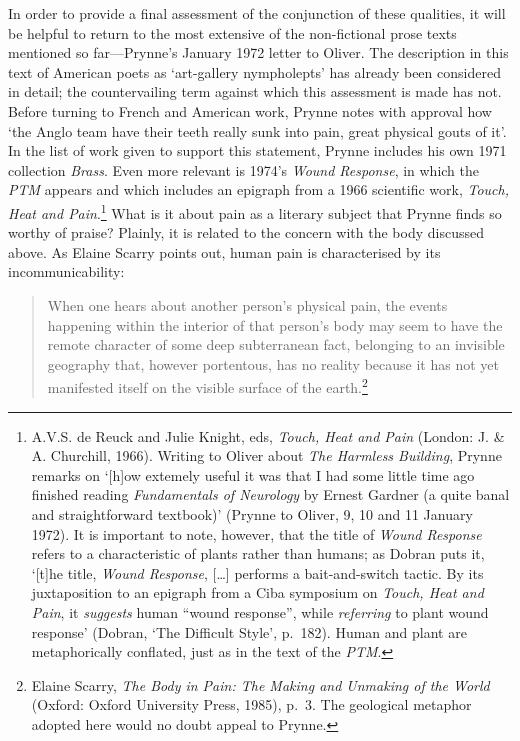 \documentclass[]{article}
\begin{document}
In order to provide a final assessment of the conjunction of these
qualities, it will be helpful to return to the most extensive of the
non-fictional prose texts mentioned so far---Prynne's January 1972
letter to Oliver. The description in this text of American poets as
`art-gallery nympholepts' has already been considered in detail; the
countervailing term against which this assessment is made has not.
Before turning to French and American work, Prynne notes with approval
how `the Anglo team have their teeth really sunk into pain, great
physical gouts of it'. In the list of work given to support this
statement, Prynne includes his own 1971 collection \emph{Brass}. Even
more relevant is 1974's \emph{Wound Response}, in which the \emph{PTM}
appears and which includes an epigraph from a 1966 scientific work,
\emph{Touch, Heat and Pain}.\footnote{A.V.S. de Reuck and Julie Knight,
  eds, \emph{Touch, Heat and Pain} (London: J. \& A. Churchill, 1966).
  Writing to Oliver about \emph{The Harmless Building}, Prynne remarks
  on `{[}h{]}ow extemely useful it was that I had some little time ago
  finished reading \emph{Fundamentals of Neurology} by Ernest Gardner (a
  quite banal and straightforward textbook)' (Prynne to Oliver, 9, 10
  and 11 January 1972). It is important to note, however, that the title
  of \emph{Wound Response} refers to a characteristic of plants rather
  than humans; as Dobran puts it, `{[}t{]}he title, \emph{Wound
  Response}, {[}\ldots{}{]} performs a bait-and-switch tactic. By its
  juxtaposition to an epigraph from a Ciba symposium on \emph{Touch,
  Heat and Pain}, it \emph{suggests} human ``wound response'', while
  \emph{referring} to plant wound response' (Dobran, `The Difficult
  Style', p.~182). Human and plant are metaphorically conflated, just as
  in the text of the \emph{PTM}.} What is it about pain as a literary
subject that Prynne finds so worthy of praise? Plainly, it is related to
the concern with the body discussed above. As Elaine Scarry points out,
human pain is characterised by its incommunicability:

\begin{quote}
When one hears about another person's physical pain, the events
happening within the interior of that person's body may seem to have the
remote character of some deep subterranean fact, belonging to an
invisible geography that, however portentous, has no reality because it
has not yet manifested itself on the visible surface of the
earth.\footnote{Elaine Scarry, \emph{The Body in Pain: The Making and
  Unmaking of the World} (Oxford: Oxford University Press, 1985), p.~3.
  The geological metaphor adopted here would no doubt appeal to Prynne.}
\end{quote}
\end{document}
